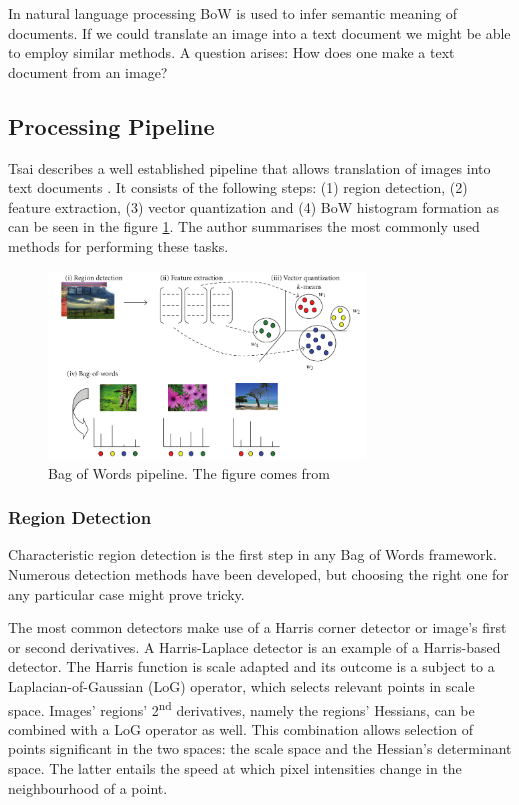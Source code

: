 \documentclass[11pt,twoside]{article}
\begin{document}
  In natural language processing BoW is used to infer semantic meaning of documents. If we could translate an image into a text document we might be able to employ similar methods. A question arises: How does one make a text document from an image?

  \subsection{Processing Pipeline}	
    Tsai describes a well established pipeline that allows translation of images into text documents \cite{tsai2012bag}. It consists of the following steps: (1) region detection, (2) feature extraction, (3) vector quantization and (4) BoW histogram formation as can be seen in the figure \ref{fig:bow_pipeline}. The author summarises the most commonly used methods for performing these tasks. 

    \begin{figure}[!ht]
    \centering
    \includegraphics[width=0.75\textwidth]{../figs/tsai2012}
    \caption{Bag of Words pipeline. The figure comes from \cite{tsai2012bag}}
    \label{fig:bow_pipeline}
    \end{figure}
	
  \subsubsection{Region Detection}
    Characteristic region detection is the first step in any Bag of Words framework. Numerous detection methods have been developed, but choosing the right one for any particular case might prove tricky. 
    
    The most common detectors make use of a Harris corner detector or image's first or second derivatives. A Harris-Laplace detector is an example of a Harris-based detector. The Harris function is scale adapted and its outcome is a subject to a Laplacian-of-Gaussian (LoG) operator, which selects relevant points in scale space. Images' regions' 2\textsuperscript{nd} derivatives, namely the regions' Hessians, can be combined with a LoG operator as well. This combination allows selection of points significant in the two spaces: the scale space and the Hessian's determinant space. The latter entails the speed at which pixel intensities change in the neighbourhood of a point.	
\end{document}
